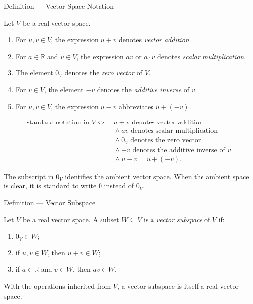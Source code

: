 \DefinitionalRoot

\begin{definitionbox}{Definition --- Vector Space Notation}
\begin{definition}\label{def:vector-spaces-notation}
Let \(V\) be a real vector space.
\begin{enumerate}
  \item For \(u,v\in V\), the expression \(u+v\) denotes \emph{vector
        addition}.
  \item For \(a\in\mathbb{R}\) and \(v\in V\), the expression \(a v\) or
        \(a\cdot v\) denotes \emph{scalar multiplication}.
  \item The element \(0_V\) denotes the \emph{zero vector} of \(V\).
  \item For \(v\in V\), the element \(-v\) denotes the \emph{additive inverse}
        of \(v\).
  \item For \(u,v\in V\), the expression \(u-v\) abbreviates
        \(u+(-v)\).
\end{enumerate}
\end{definition}
\end{definitionbox}

\begin{remark*}
\[
\begin{aligned}
\text{standard notation in \(V\)}
\Longleftrightarrow\;&
u+v\text{ denotes vector addition}
\\
&{}\land
a v\text{ denotes scalar multiplication}
\\
&{}\land
0_V\text{ denotes the zero vector}
\\
&{}\land
-v\text{ denotes the additive inverse of \(v\)}
\\
&{}\land
u-v=u+(-v).
\end{aligned}
\]
\end{remark*}

\begin{remark*}[Interpretation]
The subscript in \(0_V\) identifies the ambient vector space.  When the
ambient space is clear, it is standard to write \(0\) instead of \(0_V\).
\end{remark*}

\DefinitionalRoot

\begin{definitionbox}{Definition --- Vector Subspace}
\begin{definition}\label{def:vector-spaces-subspace}
Let \(V\) be a real vector space.  A subset \(W\subseteq V\) is a
\emph{vector subspace} of \(V\) if:
\begin{enumerate}
  \item \(0_V\in W\);
  \item if \(u,v\in W\), then \(u+v\in W\);
  \item if \(a\in\mathbb{R}\) and \(v\in W\), then \(a v\in W\).
\end{enumerate}
With the operations inherited from \(V\), a vector subspace is itself a real
vector space.
\end{definition}
\end{definitionbox}

